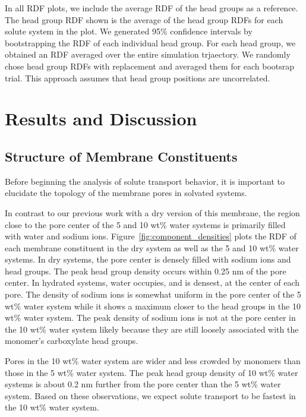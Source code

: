 \documentclass[journal=jpcbfk,manuscript=article]{achemso}
\begin{document}
  In all RDF plots, we include the average RDF of the head groups as
  a reference. The head group RDF shown is the average of the head 
  group RDFs for each solute system in the plot. We generated 
  95\% confidence intervals by bootstrapping the RDF of each individual
  head group. For each head group, we obtained an RDF averaged over the
  entire simulation trjaectory. We randomly chose head group RDFs with replacement
  and averaged them for each bootsrap trial. This approach assumes that
  head group positions are uncorrelated.
   
  \section{Results and Discussion}
  
  \subsection{Structure of Membrane Constituents}\label{section:membrane_components} 
  
  Before beginning the analysis of solute transport behavior, it is important to
  elucidate the topology of the membrane pores in solvated systems.  
  
  In contrast to our previous work with a dry version of this membrane, the 
  region close to the pore center of the 5 and 10 wt\% water systems is 
  primarily filled with water and sodium ions. Figure~\ref{fig:component_densities}
  plots the RDF of each membrane constituent in the dry system as well as the
  5 and 10 wt\% water systems. In dry systems, the pore center is densely 
  filled with sodium ions and head groups. The peak head group density occurs
  within 0.25 nm of the pore center. In hydrated systems, water occupies, 
  and is densest, at the center of each pore. The density of sodium ions is 
  somewhat uniform in the pore center of the 5 wt\% water system while it shows
  a maximum closer to the head groups in the 10 wt\% water system. The peak 
  density of sodium ions is not at the pore center in the 10 wt\% water system
  likely because they are still loosely associated with the monomer's carboxylate
  head groups.
  
  Pores in the 10 wt\% water system are wider and less crowded by monomers than
  those in the 5 wt\% water system. The peak head group density of 10 wt\% water
  systems is about 0.2 nm further from the pore center than the 5 wt\% water system. 
  Based on these observations, we expect solute transport to be fastest in the 
  10 wt\% water system.
  
\end{document}
